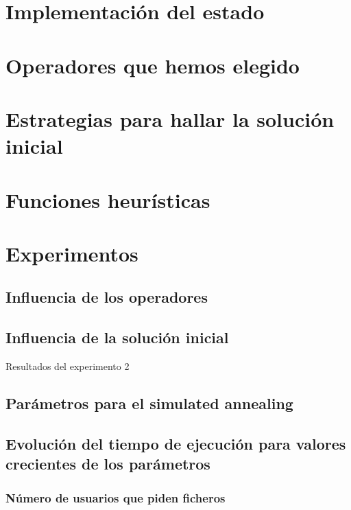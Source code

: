 \section{Implementación del estado}

\section{Operadores que hemos elegido}

\section{Estrategias para hallar la solución inicial}

\section{Funciones heurísticas}

\section{Experimentos}

\subsection{Influencia de los operadores}

\subsection{Influencia de la solución inicial}

\begin{table}[H]
    \caption{Resultados del experimento 2}%
    \label{tab:ex2}
    \begin{center}
    
    \end{center}
\end{table}

\subsection{Parámetros para el simulated annealing}

\subsection{Evolución del tiempo de ejecución para valores crecientes de los parámetros}

\subsubsection{Número de usuarios que piden ficheros}

